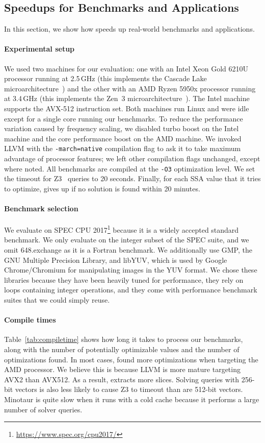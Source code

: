 \subsection{Speedups for Benchmarks and Applications}

In this section, we show how \tool{} speeds up real-world benchmarks
and applications.

\paragraph{Experimental setup}
%
We used two machines for our evaluation: one with an Intel Xeon Gold
6210U processor running at 2.5\,GHz (this implements the Cascade Lake
microarchitecture~\cite{cascadelake}) and the other with an
AMD Ryzen 5950x processor
running at 3.4\,GHz (this implements the Zen~3 microarchitecture~\cite{zen3}).
The Intel machine supports the AVX-512 instruction set.
%
Both machines run Linux and were idle except for a single core running
our benchmarks.
%
To reduce the performance variation caused by frequency scaling, we
disabled turbo boost on the Intel machine and the core performance
boost on the AMD machine.
%
We invoked LLVM with the \texttt{-march=native} compilation flag to
ask it to take maximum advantage of processor features; we left other
compilation flags unchanged, except where noted.
%
All benchmarks are compiled at the \texttt{-O3} optimization level.
%
We set the timeout for Z3~\cite{z3} queries to 20 seconds.
%
Finally, for each SSA value that it tries to optimize, \tool{} gives
up if no solution is found within 20 minutes.


\paragraph{Benchmark selection}
%
We evaluate on SPEC CPU 2017\footnote{\url{https://www.spec.org/cpu2017/}}
because it is a widely accepted standard
benchmark.
%
We only evaluate on the integer subset of the SPEC suite, and we omit
648.exchange as it is a Fortran benchmark.
%
We additionally use GMP, the GNU Multiple Precision Library, and
libYUV, which is used by Google Chrome/Chromium for manipulating
images in the YUV format.
%
We chose these libraries because they have been heavily tuned for
performance, they rely on loops containing integer operations, and
they come with performance benchmark suites that we could simply
reuse.


\paragraph{Compile times}
%
Table~\ref{tab:compiletime} shows how long it takes \tool{} to process
our benchmarks, along with the number of potentially optimizable
values and the number of optimizations found.
%
In most cases, \tool{} found more optimizations when targeting the AMD
processor.  We believe this is because LLVM is more mature targeting
AVX2 than AVX512.  As a result, \tool{} extracts more slices.  Solving
queries with 256-bit vectors is also less likely to cause Z3 to timeout
than are 512-bit vectors.
%
Minotaur is quite slow when it runs with a cold cache because it
performs a large number of solver queries.


